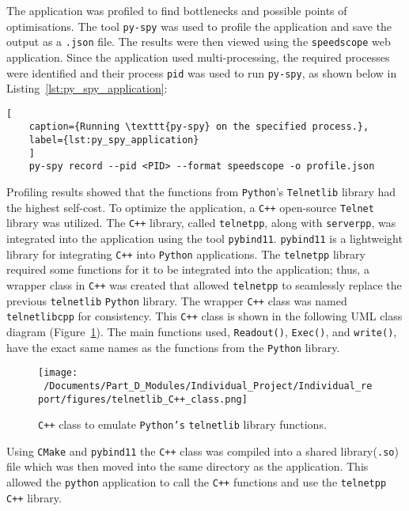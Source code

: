 The application was profiled to find bottlenecks and possible points of optimisations. The tool \texttt{py-spy} was used to profile the application and save the output as a \texttt{.json} file. The results were then viewed using the \texttt{speedscope} web application\cite{speedscope_app}. Since the application used multi-processing, the required processes were identified and their process \texttt{pid} was used to run \texttt{py-spy}, as shown below in Listing~\ref{lst:py_spy_application}:

\begin{lstlisting}[
	caption={Running \texttt{py-spy} on the specified process.},
	label={lst:py_spy_application}
	]
	py-spy record --pid <PID> --format speedscope -o profile.json 
\end{lstlisting}


Profiling results showed that the functions from \texttt{Python}'s \texttt{Telnetlib} library had the highest self-cost. To optimize the application, a \texttt{C++} open-source \texttt{Telnet} library was utilized. The \texttt{C++} library, called \texttt{telnetpp},\cite{telnetpp_library} along with \texttt{serverpp},\cite{serverpp_library} was integrated into the application using the tool \texttt{pybind11}. \texttt{pybind11} is a lightweight library for integrating \texttt{C++} into \texttt{Python} applications. The \texttt{telnetpp} library required some functions for it to be integrated into the application; thus, a wrapper class in \texttt{C++} was created that allowed \texttt{telnetpp} to seamlessly replace the previous \texttt{telnetlib} \texttt{Python} library. The wrapper \texttt{C++} class was named \texttt{telnetlibcpp} for consistency. This \texttt{C++} class is shown in the following UML class diagram (Figure~\ref{fig:telnetlibcpp_UML}). The main functions used, \texttt{Readout()}, \texttt{Exec()}, and \texttt{write()}, have the exact same names as the functions from the \texttt{Python} library.

\begin{figure}[htbp] %
	\centering
	\texttt{[image: ~/Documents/Part\_D\_Modules/Individual\_Project/Individual\_report/figures/telnetlib\_C++\_class.png]} %
	\caption{\texttt{C++} class to emulate \texttt{Python's} \texttt{telnetlib} library functions.}
	\label{fig:telnetlibcpp_UML} %
\end{figure}

Using \texttt{CMake} and \texttt{pybind11} the \texttt{C++} class was compiled into a shared library(\texttt{.so}) file which was then moved into the same directory as the application. This allowed the \texttt{python} application to call the \texttt{C++} functions and use the \texttt{telnetpp} \texttt{C++} library. 

